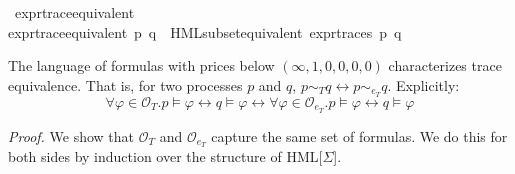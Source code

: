 \begin{isabellebody}
\isanewline
{}\isamarkupfalse%
\ expr{\isacharunderscore}{\kern0pt}trace{\isacharunderscore}{\kern0pt}equivalent\ \isanewline
\ \ \isanewline
{\isachardoublequoteopen}expr{\isacharunderscore}{\kern0pt}trace{\isacharunderscore}{\kern0pt}equivalent\ p\ q\ {\isasymequiv}\ HML{\isacharunderscore}{\kern0pt}subset{\isacharunderscore}{\kern0pt}equivalent\ expr{\isacharunderscore}{\kern0pt}traces\ p\ q{\isachardoublequoteclose}\isanewline
{}\isamarkupfalse%
%
\isadelimdocument
%
\endisadelimdocument
%
\isatagdocument
%
\isamarkuptrue%
%
\endisatagdocument
{\isafolddocument}%
%
\isadelimdocument
%
\endisadelimdocument
%
\begin{isamarkuptext}%
The language of formulas with prices below $(\infty, 1, 0, 0, 0, 0)$ characterizes trace equivalence. That is, for two processes $p$ and $q$, $p \sim_T q \longleftrightarrow p \sim_{e_T} q$. Explicitly: \\

\[
\forall \varphi \in \mathcal{O}_T. p \models \varphi \longleftrightarrow q \models \varphi \longleftrightarrow \forall \varphi \in \mathcal{O}_{e_T}. p \models \varphi \longleftrightarrow q \models \varphi
\]%
\end{isamarkuptext}\isamarkuptrue%
%
\begin{isamarkuptext}%
\textit{Proof.} We show that $\mathcal{O}_T$ and $\mathcal{O}_{e_T}$ capture the same set of formulas. We do this for both sides by induction over the structure of \textsf{HML}[$\Sigma$].


\end{isamarkuptext}
\end{isabellebody}
